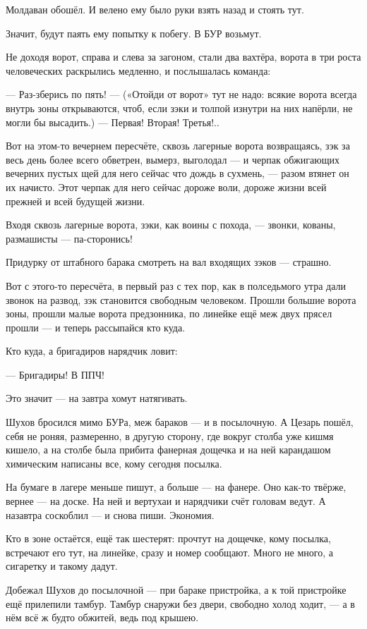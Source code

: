 Молдаван обошёл. И велено ему было руки взять назад и стоять тут.

Значит, будут паять ему попытку к побегу. В БУР возьмут.

Не доходя ворот, справа и слева за загоном, стали два вахтёра, ворота в три роста
человеческих раскрылись медленно, и послышалась команда:

--- Раз-зберись по пять! --- («Отойди от ворот» тут не надо: всякие ворота всегда внутрь зоны
открываются, чтоб, если зэки и толпой изнутри на них напёрли, не могли бы высадить.) --- Первая!
Вторая! Третья!..

Вот на этом-то вечернем пересчёте, сквозь лагерные ворота возвращаясь, зэк за весь день
более всего обветрен, вымерз, выголодал --- и черпак обжигающих вечерних пустых щей для него
сейчас что дождь в сухмень, --- разом втянет он их начисто. Этот черпак для него сейчас дороже
воли, дороже жизни всей прежней и всей будущей жизни.

Входя сквозь лагерные ворота, зэки, как воины с похода, --- звонки, кованы, размашисты ---
па-сторонись!

Придурку от штабного барака смотреть на вал входящих зэков --- страшно.

Вот с этого-то пересчёта, в первый раз с тех пор, как в полседьмого утра дали звонок на развод,
зэк становится свободным человеком. Прошли большие ворота зоны, прошли малые ворота
предзонника, по линейке ещё меж двух прясел прошли --- и теперь рассыпайся кто куда.

Кто куда, а бригадиров нарядчик ловит:

--- Бригадиры! В ППЧ!

Это значит --- на завтра хомут натягивать.

Шухов бросился мимо БУРа, меж бараков --- и в посылочную. А Цезарь пошёл, себя не роняя,
размеренно, в другую сторону, где вокруг столба уже кишмя кишело, а на столбе была прибита
фанерная дощечка и на ней карандашом химическим написаны все, кому сегодня посылка.

На бумаге в лагере меньше пишут, а больше --- на фанере. Оно как-то твёрже, вернее --- на доске. На
ней и вертухаи и нарядчики счёт головам ведут. А назавтра соскоблил --- и снова пиши. Экономия.

Кто в зоне остаётся, ещё так шестерят: прочтут на дощечке, кому посылка, встречают его тут, на
линейке, сразу и номер сообщают. Много не много, а сигаретку и такому дадут.

Добежал Шухов до посылочной --- при бараке пристройка, а к той пристройке ещё прилепили
тамбур. Тамбур снаружи без двери, свободно холод ходит, --- а в нём всё ж будто обжитей, ведь
под крышею.

